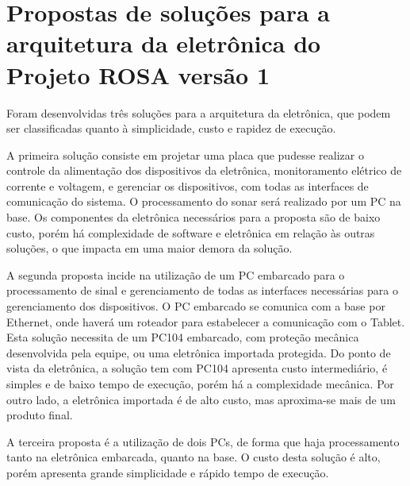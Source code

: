 


\section{Propostas de soluções para a arquitetura da eletrônica do Projeto ROSA
versão 1}

Foram desenvolvidas três soluções para a arquitetura da eletrônica, que podem
ser classificadas quanto à simplicidade, custo e rapidez de execução.

A primeira solução consiste em projetar uma placa que pudesse realizar o
controle da alimentação dos dispositivos da eletrônica, monitoramento elétrico
de corrente e voltagem, e gerenciar os dispositivos, com todas as interfaces de
comunicação do sistema. O processamento do sonar será realizado por um PC na
base. Os componentes da eletrônica necessários para a proposta são de baixo
custo, porém há complexidade de software e eletrônica em relação às outras
soluções, o que impacta em uma maior demora da solução.

A segunda proposta incide na utilização de um PC embarcado para o processamento
de sinal e gerenciamento de todas as interfaces necessárias para o gerenciamento
dos dispositivos. O PC embarcado se comunica com a base por Ethernet, onde
haverá um roteador para estabelecer a comunicação com o Tablet.
Esta solução necessita de um PC104 embarcado, com proteção mecânica desenvolvida
pela equipe, ou uma eletrônica importada protegida. Do ponto de vista da
eletrônica, a solução tem com PC104 apresenta custo intermediário, é simples e
de baixo tempo de execução, porém há a complexidade mecânica. Por outro lado, a
eletrônica importada é de alto custo, mas aproxima-se mais de um produto final.

A terceira proposta é a utilização de dois PCs, de forma que haja processamento
tanto na eletrônica embarcada, quanto na base. O custo desta solução é alto,
porém apresenta grande simplicidade e rápido tempo de execução.